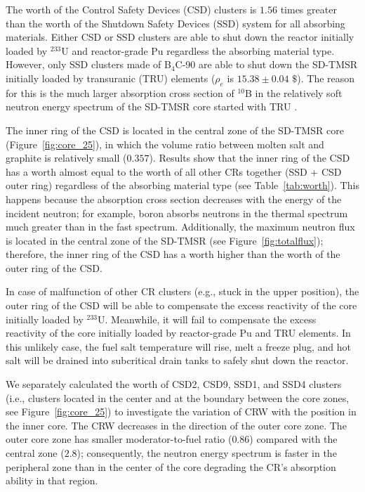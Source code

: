 The worth of the Control Safety Devices (CSD) clusters is $1.56$ times greater than 
the worth of the Shutdown Safety Devices (SSD) system for all absorbing materials. Either CSD or SSD 
clusters are able to shut down the reactor initially loaded by 
$^{233}$U and reactor-grade Pu regardless the absorbing material type.
However, only SSD clusters made of B$_4$C-90 are able to shut down the SD-TMSR 
initially loaded by transuranic (TRU) elements ($\rho_e$ is $15.38\pm0.04$ $\$$).
The reason for this is the much larger 
absorption cross section of $^{10}$B in the relatively soft neutron energy 
spectrum of the SD-TMSR core started with TRU \cite{ashraf2020Strategies}.

The inner ring of the CSD is located in the central zone of the SD-TMSR core 
(Figure~\ref{fig:core_25}), in which the volume ratio between molten salt and 
graphite is relatively small ($0.357$). Results show that the inner ring of the CSD has 
a worth almost equal to the worth of all other CRs together (SSD + CSD outer ring) regardless of 
the absorbing material type (see Table~\ref{tab:worth}). This happens because the absorption cross section
decreases with the energy of the incident neutron; for example, boron absorbs neutrons in the thermal spectrum much 
greater than in the fast spectrum. Additionally, the maximum neutron flux is located in the central zone of the SD-TMSR (see Figure~\ref{fig:totalflux}); therefore, the inner ring of the CSD has a worth higher than the worth of the outer ring of the CSD.

In case of malfunction of other CR clusters (e.g., stuck in the upper 
position), the outer ring of the CSD will be able to compensate the excess reactivity of the core initially loaded by $^{233}$U.
Meanwhile, it will fail to compensate the excess 
reactivity of the core initially loaded by reactor-grade Pu and TRU elements. In this unlikely case, the fuel salt temperature will rise, melt a freeze plug, and hot salt will be drained into subcritical drain tanks to safely shut down the reactor.

We separately calculated the worth of CSD2, CSD9, SSD1, and SSD4 clusters (i.e., clusters located in the center and at the boundary between the core
zones, see Figure~\ref{fig:core_25}) to investigate the variation of CRW with the position in the inner core.
The CRW decreases in the direction of the outer core zone. The outer core zone 
has smaller moderator-to-fuel ratio ($0.86$) compared with the central zone 
($2.8$); consequently, the neutron energy spectrum is faster in the peripheral 
zone than in the center of the core degrading the CR's 
absorption ability in that region.


